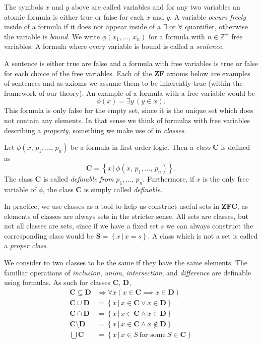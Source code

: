 \documentclass[../../main.tex]{subfiles}
\begin{document}
The symbols $x$ and $y$ above are called variables and for any two variables an atomic formula is either true or false for each $x$ and $y$.
A variable \textit{occurs freely} inside of a formula if it does not appear inside of a $\exists$ or $\forall$ quantifier, otherwise the variable is \textit{bound}.
We write $\phi\left(x_1,\ldots,\, x_n\right)$ for a formula with $n \in \mathbb{Z}^+$ free variables.
A formula where every variable is bound is called a \textit{sentence}. \cite[pp.10-11]{Mar02}

A sentence is either true are false and a formula with free variables is true or false for each choice of the free variables.
Each of the \textbf{ZF} axioms below are examples of sentences and as axioms we assume them to be inherently true (within the framework of our theory).
An example of a formula with a free variable would be $$\phi(x) = \exists y \, \left(y \in x\right).$$ 
This formula is only false for the empty set, since it is the unique set which does not contain any elements.
In that sense we think of formulas with free variables describing a \textit{property}, something we make use of in \textit{classes}.

\begin{definition}[Class]
    Let $\phi\left(x,\, p_1,\ldots,\, p_n\right)$ be a formula in first order logic.
    Then a \textit{class} $\mathbf{C}$ is defined as
    $$\mathbf{C} = \left\{x \,\vert\, \phi\left(x,\, p_1,\ldots,\, p_n\right)\right\}.$$
    The class $\mathbf{C}$ is called \textit{definable from} $p_1,\ldots,\, p_n$.
    Furthermore, if $x$ is the only free variable of $\phi$, the class $\mathbf{C}$ is simply called \textit{definable}. \cite[p.3]{Jec78}
\end{definition}

In practice, we use classes as a tool to help us construct useful sets in \textbf{ZFC}, as elements of classes are always sets in the stricter sense.
All sets are classes, but not all classes are sets, since if we have a fixed set $s$ we can always construct the corresponding class would be $\mathbf{S} = \left\{x \,\vert\, x = s\right\}$.
A class which is not a set is called a \textit{proper class}.

We consider to two classes to be the same if they have the same elements.
The familiar operations of \textit{inclusion}, \textit{union}, \textit{intersection}, and \textit{difference} are definable using formulas.
As such for classes $\mathbf{C}$, $\mathbf{D}$,
\begin{align*}
    \mathbf{C} \subseteq \mathbf{D} &\iff \forall x \left(x \in \mathbf{C} \implies x \in \mathbf{D}\right) \\
    \mathbf{C} \cup \mathbf{D} &= \left\{x \,\vert\, x \in \mathbf{C} \vee x \in \mathbf{D}\right\} \\
    \mathbf{C} \cap \mathbf{D} &= \left\{x \,\vert\, x \in \mathbf{C} \wedge x \in \mathbf{D}\right\} \\ 
    \mathbf{C} \setminus \mathbf{D} &= \left\{x \,\vert\, x \in \mathbf{C} \wedge x \not\in \mathbf{D}\right\} \\
    \bigcup \mathbf{C} &= \left\{x \,\vert\, x \in S \ \text{for some}\ S \in \mathbf{C}\right\}
\end{align*}\cite[pp.3-4]{Jec78}
\end{document}
